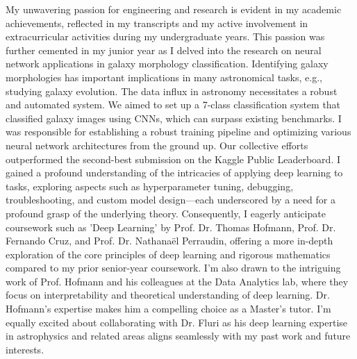 \documentclass{article}
\begin{document}
\hspace{0.25in}My unwavering passion for engineering and research is evident in my academic
achievements, reflected in my transcripts and my active involvement in
extracurricular activities during my undergraduate years. This passion was
further cemented in my junior year as I delved into the research on neural
network applications in galaxy morphology classification. Identifying galaxy
morphologies has important implications in many astronomical tasks, e.g.,
studying galaxy evolution. The data influx in astronomy necessitates a robust
and automated system. We aimed to set up a 7-class classification system that
classified galaxy images using CNNs, which can surpass existing benchmarks. I
was responsible for establishing a robust training pipeline and optimizing
various neural network architectures from the ground up. Our collective efforts
outperformed the second-best submission on the Kaggle Public Leaderboard. I
gained a profound understanding of the intricacies of applying deep learning to
tasks, exploring aspects such as hyperparameter tuning, debugging,
troubleshooting, and custom model design—each underscored by a need for a
profound grasp of the underlying theory. Consequently, I eagerly anticipate
coursework such as 'Deep Learning' by Prof. Dr. Thomas Hofmann, Prof. Dr.
Fernando Cruz, and Prof. Dr. Nathanaël Perraudin, offering a more in-depth
exploration of the core principles of deep learning and rigorous mathematics
compared to my prior senior-year coursework. I'm also drawn to the intriguing
work of Prof. Hofmann and his colleagues at the Data Analytics lab, where they
focus on interpretability and theoretical understanding of deep learning. Dr.
Hofmann's expertise makes him a compelling choice as a Master's tutor. I'm
equally excited about collaborating with Dr. Fluri as his deep learning
expertise in astrophysics and related areas aligns seamlessly with my past work
and future interests.
\vspace{5pt}
\end{document}
